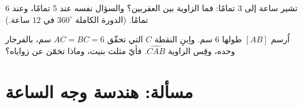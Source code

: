 \begin{exercise}[$\star\star$]\label{exo:g6:lines:11}
تشير ساعة إلى 3 تمامًا: فما الزاوية بين العقربين؟ والسؤال نفسه
عند 5 تمامًا، وعند 6 تمامًا. (الدورة الكاملة $360^\circ$
في $12$ ساعة.)
\end{exercise}

\begin{exercise}[$\star\star\star$]\label{exo:g6:lines:12}
اُرسم  $[AB]$ طولها $6$ سم. واِبنِ النقطة $C$ التي تحقّق
$AC = BC = 6$ سم، بالفرجار وحده، وقِس الزاوية
$\widehat{CAB}$. فأيّ مثلث بنيت، وماذا
تخمّن عن زواياه؟
\end{exercise}

\section{مسألة: هندسة وجه الساعة}

